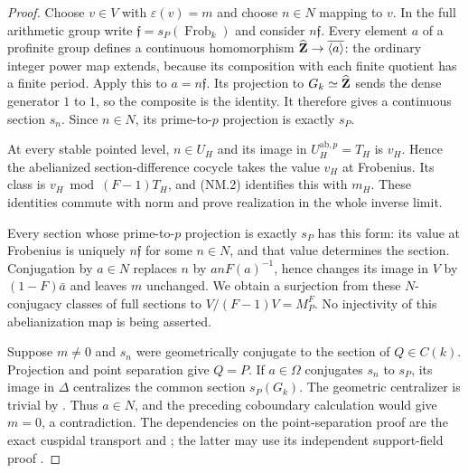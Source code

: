\begin{proof}
Choose $v\in V$ with $\varepsilon(v)=m$ and choose $n\in N$
mapping to $v$. In the full arithmetic group write
$\mathfrak f=s_P(\operatorname{Frob}_k)$ and consider
$n\mathfrak f$. Every element $a$ of a profinite group defines a
continuous homomorphism $\widehat{\mathbf Z}\to\overline{\langle a\rangle}$:
the ordinary integer power map extends, because its composition
with each finite quotient has a finite period. Apply this to
$a=n\mathfrak f$. Its projection to $G_k\simeq\widehat{\mathbf Z}$ sends
the dense generator $1$ to $1$, so the composite is the identity.
It therefore gives a continuous section $s_n$. Since $n\in N$,
its prime-to-$p$ projection is exactly $s_P$.

At every stable pointed level, $n\in U_H$ and its image in
$U_H^{\mathrm{ab},p}=T_H$ is $v_H$. Hence the abelianized
section-difference cocycle takes the value $v_H$ at Frobenius.
Its class is $v_H\bmod(F-1)T_H$, and (NM.2) identifies this with
$m_H$. These identities commute with norm and prove realization
in the whole inverse limit.

Every section whose prime-to-$p$ projection is exactly $s_P$ has
this form: its value at Frobenius is uniquely $n\mathfrak f$ for
some $n\in N$, and that value determines the section. Conjugation
by $a\in N$ replaces $n$ by $a n F(a)^{-1}$, hence changes its
image in $V$ by $(1-F)\bar a$ and leaves $m$ unchanged. We obtain
a surjection from these $N$-conjugacy classes of full sections to
$V/(F-1)V=M_P^F$. No injectivity of this abelianization map is
being asserted.

Suppose $m\ne0$ and $s_n$ were geometrically conjugate to the
section of $Q\in C(k)$. Projection and point separation give
$Q=P$. If $a\in\Omega$ conjugates $s_n$ to $s_P$, its image in
$\Delta$ centralizes the common section $s_P(G_k)$. The geometric
centralizer is trivial by . Thus $a\in N$,
and the preceding coboundary calculation would give $m=0$, a
contradiction. The dependencies on the point-separation proof are
the exact cuspidal transport and ; the latter
may use its independent support-field proof
.
\end{proof}

